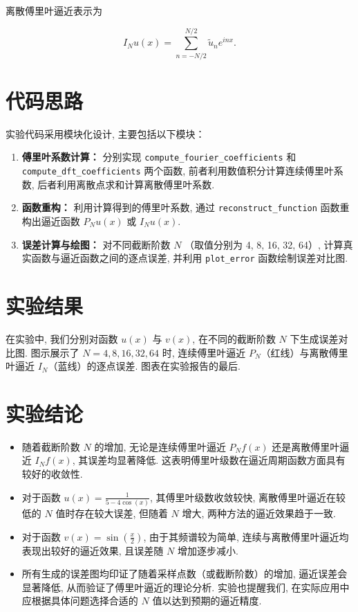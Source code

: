 \documentclass{article}
\begin{document}
			离散傅里叶逼近表示为

			\begin{equation*}
				I_N u(x)=\sum_{n=-N/2}^{N/2}\tilde{u}_n e^{inx}.
			\end{equation*}

	\section{代码思路}
		实验代码采用模块化设计, 主要包括以下模块：
		\begin{enumerate}
			\item \textbf{傅里叶系数计算：} 分别实现 \texttt{compute\_fourier\_coefficients} 和 \texttt{compute\_dft\_coefficients} 两个函数, 前者利用数值积分计算连续傅里叶系数, 后者利用离散点求和计算离散傅里叶系数. 
			\item \textbf{函数重构：} 利用计算得到的傅里叶系数, 通过 \texttt{reconstruct\_function} 函数重构出逼近函数 $P_N u(x)$ 或 $I_N u(x)$.
			\item \textbf{误差计算与绘图：} 对不同截断阶数 $N$ （取值分别为 4, 8, 16, 32, 64）, 计算真实函数与逼近函数之间的逐点误差, 并利用 \texttt{plot\_error} 函数绘制误差对比图. 
		\end{enumerate}

	\section{实验结果}
		在实验中, 我们分别对函数 $u(x)$ 与 $v(x)$, 在不同的截断阶数 $N$ 下生成误差对比图. 图示展示了 $N=4,8,16,32,64$ 时, 连续傅里叶逼近 $P_N$（红线）与离散傅里叶逼近 $I_N$（蓝线）的逐点误差. 图表在实验报告的最后.

	\section{实验结论}
		\begin{itemize}
			\item 随着截断阶数 $N$ 的增加, 无论是连续傅里叶逼近 $P_N f(x)$ 还是离散傅里叶逼近 $I_N f(x)$, 其误差均显著降低. 这表明傅里叶级数在逼近周期函数方面具有较好的收敛性.
			\item 对于函数 $u(x)=\frac{1}{5-4\cos(x)}$, 其傅里叶级数收敛较快, 离散傅里叶逼近在较低的 $N$ 值时存在较大误差, 但随着 $N$ 增大, 两种方法的逼近效果趋于一致.
			\item 对于函数 $v(x)=\sin\left(\frac{x}{2}\right)$, 由于其频谱较为简单, 连续与离散傅里叶逼近均表现出较好的逼近效果, 且误差随 $N$ 增加逐步减小.
			\item 所有生成的误差图均印证了随着采样点数（或截断阶数）的增加, 逼近误差会显著降低, 从而验证了傅里叶逼近的理论分析. 实验也提醒我们, 在实际应用中应根据具体问题选择合适的 $N$ 值以达到预期的逼近精度.
		\end{itemize}
\end{document}
